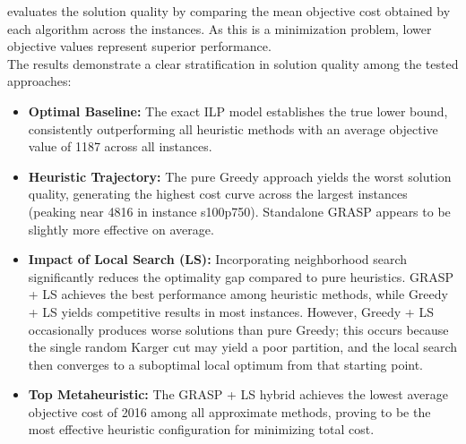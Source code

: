 \documentclass{article}
\begin{document}



 evaluates the solution quality by comparing the mean objective cost obtained by each algorithm across the instances. As this is a minimization problem, lower objective values represent superior performance.
\\
The results demonstrate a clear stratification in solution quality among the tested approaches:
\begin{itemize}
    \item \textbf{Optimal Baseline:}  The exact ILP model establishes the true lower bound, consistently outperforming all heuristic methods with an average objective value of 1187 across all instances.
    \item \textbf{Heuristic Trajectory:} The pure Greedy approach yields the worst solution quality, generating the highest cost curve across the largest instances (peaking near 4816 in instance s100p750). Standalone GRASP appears to be slightly more effective on average.
    \item \textbf{Impact of Local Search (LS):} Incorporating neighborhood search significantly reduces the optimality gap compared to pure heuristics. GRASP + LS achieves the best performance among heuristic methods, while Greedy + LS yields competitive results in most instances. However, Greedy + LS occasionally produces worse solutions than pure Greedy; this occurs because the single random Karger cut may yield a poor partition, and the local search then converges to a suboptimal local optimum from that starting point.
    \item \textbf{Top Metaheuristic:} The GRASP + LS hybrid achieves the lowest average objective cost of 2016 among all approximate methods, proving to be the most effective heuristic configuration for minimizing total cost.
\end{itemize}
\end{document}
